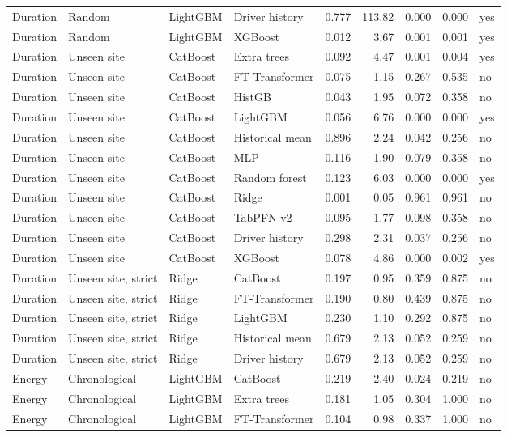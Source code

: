 {\begin{longtable}{llllrrrrl}
Duration & Random & LightGBM & Driver history & 0.777 & 113.82 & 0.000 & 0.000 & yes \\
Duration & Random & LightGBM & XGBoost & 0.012 & 3.67 & 0.001 & 0.001 & yes \\
Duration & Unseen site & CatBoost & Extra trees & 0.092 & 4.47 & 0.001 & 0.004 & yes \\
Duration & Unseen site & CatBoost & FT-Transformer & 0.075 & 1.15 & 0.267 & 0.535 & no \\
Duration & Unseen site & CatBoost & HistGB & 0.043 & 1.95 & 0.072 & 0.358 & no \\
Duration & Unseen site & CatBoost & LightGBM & 0.056 & 6.76 & 0.000 & 0.000 & yes \\
Duration & Unseen site & CatBoost & Historical mean & 0.896 & 2.24 & 0.042 & 0.256 & no \\
Duration & Unseen site & CatBoost & MLP & 0.116 & 1.90 & 0.079 & 0.358 & no \\
Duration & Unseen site & CatBoost & Random forest & 0.123 & 6.03 & 0.000 & 0.000 & yes \\
Duration & Unseen site & CatBoost & Ridge & 0.001 & 0.05 & 0.961 & 0.961 & no \\
Duration & Unseen site & CatBoost & TabPFN v2 & 0.095 & 1.77 & 0.098 & 0.358 & no \\
Duration & Unseen site & CatBoost & Driver history & 0.298 & 2.31 & 0.037 & 0.256 & no \\
Duration & Unseen site & CatBoost & XGBoost & 0.078 & 4.86 & 0.000 & 0.002 & yes \\
Duration & Unseen site, strict & Ridge & CatBoost & 0.197 & 0.95 & 0.359 & 0.875 & no \\
Duration & Unseen site, strict & Ridge & FT-Transformer & 0.190 & 0.80 & 0.439 & 0.875 & no \\
Duration & Unseen site, strict & Ridge & LightGBM & 0.230 & 1.10 & 0.292 & 0.875 & no \\
Duration & Unseen site, strict & Ridge & Historical mean & 0.679 & 2.13 & 0.052 & 0.259 & no \\
Duration & Unseen site, strict & Ridge & Driver history & 0.679 & 2.13 & 0.052 & 0.259 & no \\
Energy & Chronological & LightGBM & CatBoost & 0.219 & 2.40 & 0.024 & 0.219 & no \\
Energy & Chronological & LightGBM & Extra trees & 0.181 & 1.05 & 0.304 & 1.000 & no \\
Energy & Chronological & LightGBM & FT-Transformer & 0.104 & 0.98 & 0.337 & 1.000 & no \\

\end{longtable}}
